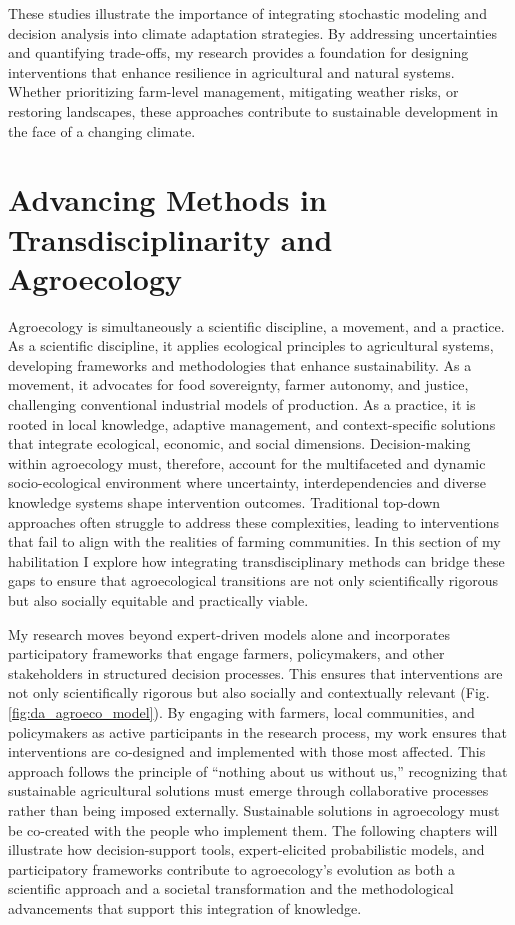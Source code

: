 \documentclass[
]{article}
\begin{document}
These studies illustrate the importance of integrating stochastic
modeling and decision analysis into climate adaptation strategies. By
addressing uncertainties and quantifying trade-offs, my research
provides a foundation for designing interventions that enhance
resilience in agricultural and natural systems. Whether prioritizing
farm-level management, mitigating weather risks, or restoring
landscapes, these approaches contribute to sustainable development in
the face of a changing climate.

\newpage

\newpage

\hypertarget{chapter_two}{%
\section{Advancing Methods in Transdisciplinarity and
Agroecology}\label{chapter_two}}

Agroecology is simultaneously a scientific discipline, a movement, and a
practice. As a scientific discipline, it applies ecological principles
to agricultural systems, developing frameworks and methodologies that
enhance sustainability. As a movement, it advocates for food
sovereignty, farmer autonomy, and justice, challenging conventional
industrial models of production. As a practice, it is rooted in local
knowledge, adaptive management, and context-specific solutions that
integrate ecological, economic, and social dimensions. Decision-making
within agroecology must, therefore, account for the multifaceted and
dynamic socio-ecological environment where uncertainty,
interdependencies and diverse knowledge systems shape intervention
outcomes. Traditional top-down approaches often struggle to address
these complexities, leading to interventions that fail to align with the
realities of farming communities. In this section of my habilitation I
explore how integrating transdisciplinary methods can bridge these gaps
to ensure that agroecological transitions are not only scientifically
rigorous but also socially equitable and practically viable.

My research moves beyond expert-driven models alone and incorporates
participatory frameworks that engage farmers, policymakers, and other
stakeholders in structured decision processes. This ensures that
interventions are not only scientifically rigorous but also socially and
contextually relevant (Fig. \ref{fig:da_agroeco_model}). By engaging
with farmers, local communities, and policymakers as active participants
in the research process, my work ensures that interventions are
co-designed and implemented with those most affected. This approach
follows the principle of ``nothing about us without us,'' recognizing
that sustainable agricultural solutions must emerge through
collaborative processes rather than being imposed externally.
Sustainable solutions in agroecology must be co-created with the people
who implement them. The following chapters will illustrate how
decision-support tools, expert-elicited probabilistic models, and
participatory frameworks contribute to agroecology's evolution as both a
scientific approach and a societal transformation and the methodological
advancements that support this integration of knowledge.
\end{document}
